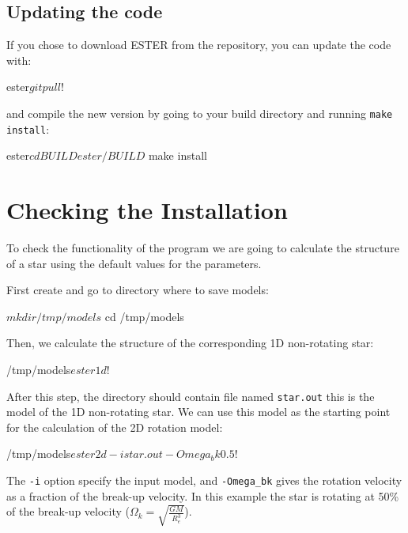 \subsection{Updating the code}
If you chose to download ESTER from the \git repository, you can update the code with:
\begin{shell}
    ester$ git pull
    !$
\end{shell}
and compile the new version by going to your build directory and running
\texttt{make install}:
\begin{shell}
    ester$ cd BUILD
    ester/BUILD$ make install
\end{shell}

\section{Checking the Installation}
To check the functionality of the program we are going to calculate the
structure of a star using the default values for the parameters.

First create and go to directory where to save models:
\begin{shell}
    $ mkdir /tmp/models
    $ cd /tmp/models
\end{shell}

Then, we calculate the structure of the corresponding 1D non-rotating star:
\begin{shell}
    /tmp/models$ ester 1d
    !$
\end{shell}
After this step, the directory should contain file named \texttt{star.out} this
is the model of the 1D non-rotating star.
We can use this model as the starting point for the calculation of the 2D
rotation model:
\begin{shell}
    /tmp/models$ ester 2d -i star.out -Omega_bk 0.5
    !$
\end{shell}
The \texttt{-i} option specify the input model, and \texttt{-Omega\_bk} gives
the rotation velocity as a fraction of the break-up velocity.
In this example the star is rotating at 50\% of the break-up velocity
($\Omega_k=\sqrt{\frac{GM}{R_e^3}}$).


